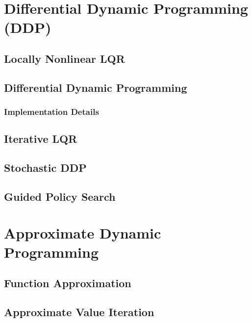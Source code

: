 	\section{Differential Dynamic Programming (DDP)} %

		\subsection{Locally Nonlinear LQR} %

		\subsection{Differential Dynamic Programming} %

			\subsubsection{Implementation Details} %

		\subsection{Iterative LQR} %

		\subsection{Stochastic DDP} %

		\subsection{Guided Policy Search} %

	\section{Approximate Dynamic Programming} %

		\subsection{Function Approximation} %

		\subsection{Approximate Value Iteration} %


